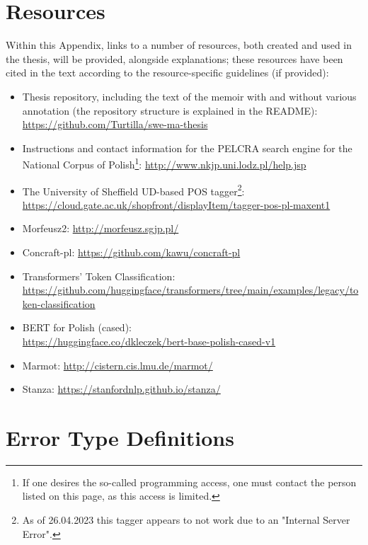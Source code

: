 \section{Resources}
\label{app-resources}

Within this Appendix, links to a number of resources, both created and used in the thesis, will be provided, alongside explanations; these resources have been cited in the text according to the resource-specific guidelines (if provided):
\begin{itemize}
    \item Thesis repository, including the text of the memoir with and without various annotation (the repository structure is explained in the README): \url{https://github.com/Turtilla/swe-ma-thesis}
    \item Instructions and contact information for the PELCRA search engine for the National Corpus of Polish\footnote{If one desires the so-called programming access, one must contact the person listed on this page, as this access is limited.}: \url{http://www.nkjp.uni.lodz.pl/help.jsp}
    \item The University of Sheffield UD-based POS tagger\footnote{As of 26.04.2023 this tagger appears to not work due to an "Internal Server Error".}: \url{https://cloud.gate.ac.uk/shopfront/displayItem/tagger-pos-pl-maxent1}
    \item Morfeusz2: \url{http://morfeusz.sgjp.pl/}
    \item Concraft-pl: \url{https://github.com/kawu/concraft-pl}
    \item Transformers' Token Classification: \\ \url{https://github.com/huggingface/transformers/tree/main/examples/legacy/token-classification}
    \item BERT for Polish (cased): \\ \url{https://huggingface.co/dkleczek/bert-base-polish-cased-v1}
    \item Marmot: \url{http://cistern.cis.lmu.de/marmot/}
    \item Stanza: \url{https://stanfordnlp.github.io/stanza/}
\end{itemize}
\newpage

\section{Error Type Definitions}
\label{error-types}

